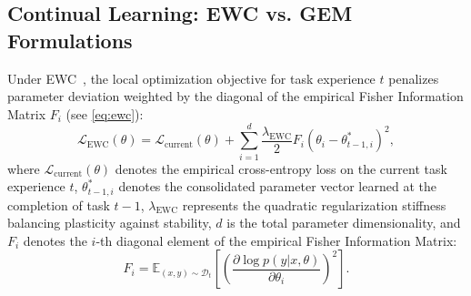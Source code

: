 \documentclass[journal,10pt,twocolumn]{IEEEtran}
\begin{document}
\subsection{Continual Learning: EWC vs. GEM Formulations}
\label{sec:continual_learning}
Under EWC~\cite{kirkpatrick2017overcoming}, the local optimization objective for task experience $t$ penalizes parameter deviation weighted by the diagonal of the empirical Fisher Information Matrix $F_i$ (see \eqref{eq:ewc}):
\begin{equation}
\mathcal{L}_{\text{EWC}}(\theta) = \mathcal{L}_{\text{current}}(\theta) + \sum_{i=1}^{d} \frac{\lambda_{\text{EWC}}}{2} F_i (\theta_i - \theta_{t-1, i}^*)^2,
\label{eq:ewc}
\end{equation}
where $\mathcal{L}_{\text{current}}(\theta)$ denotes the empirical cross-entropy loss on the current task experience $t$, $\theta_{t-1, i}^*$ denotes the consolidated parameter vector learned at the completion of task $t-1$, $\lambda_{\text{EWC}}$ represents the quadratic regularization stiffness balancing plasticity against stability, $d$ is the total parameter dimensionality, and $F_i$ denotes the $i$-th diagonal element of the empirical Fisher Information Matrix:
\begin{equation}
F_i = \mathbb{E}_{(x,y) \sim \mathcal{D}_t} \left[ \left(\frac{\partial \log p(y|x, \theta)}{\partial \theta_i}\right)^2 \right].
\label{eq:fisher}
\end{equation}
\end{document}
